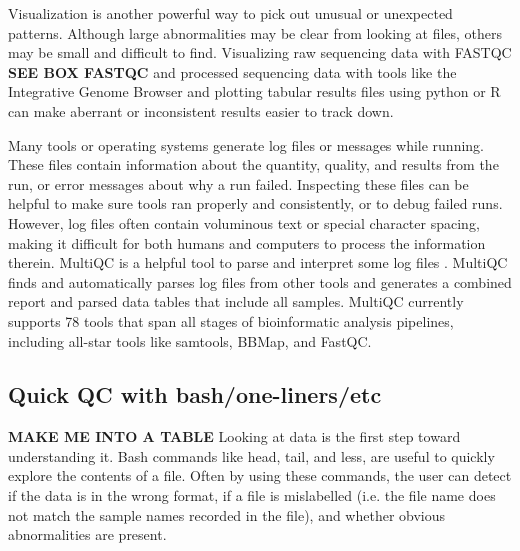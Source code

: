 \documentclass[10pt,letterpaper]{article}
\begin{document}
Visualization is another powerful way to pick out unusual or unexpected patterns. Although large abnormalities may be clear from looking at files, others may be small and difficult to find. Visualizing raw sequencing data with FASTQC \textbf{SEE BOX FASTQC} and processed sequencing data with tools like the Integrative Genome Browser and plotting tabular results files using python or R can make aberrant or inconsistent results easier to track down.

Many tools or operating systems generate log files or messages while running. These files contain information about the quantity, quality, and results from the run, or error messages about why a run failed. Inspecting these files can be helpful to make sure tools ran properly and consistently, or to debug failed runs. However, log files often contain voluminous text or special character spacing, making it difficult for both humans and computers to process the information therein. MultiQC is a helpful tool to parse and interpret some log files \cite{ewels2016}. MultiQC finds and automatically parses log files from other tools and generates a combined report and parsed data tables that include all samples. MultiQC currently supports 78 tools that span all stages of bioinformatic analysis pipelines, including all-star tools like samtools, BBMap, and FastQC. 

\begin{greybox}{\subsection*{Quick QC with bash/one-liners/etc}
\textbf{MAKE ME INTO A TABLE}
Looking at data is the first step toward understanding it. Bash commands like head, tail, and less, are useful to quickly explore the contents of a file. Often by using these commands, the user can detect if the data is in the wrong format, if a file is mislabelled (i.e. the file name does not match the sample names recorded in the file), and whether obvious abnormalities are present. }
\end{greybox}
\end{document}
